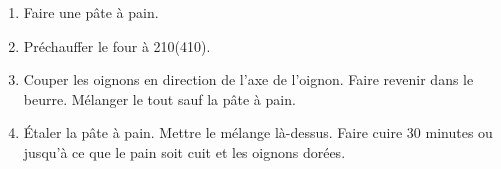 
\begin{ingredients}
\end{ingredients}


\begin{recipe}
  \begin{enumerate}

  \item Faire une p\^ate \`a pain.

  \item Pr\'echauffer le four \`a 210\degreeC (410\F).

  \item Couper les oignons en direction de l'axe de l'oignon.
    Faire revenir dans le beurre.
    M\'elanger le tout sauf la p\^ate \`a pain.

  \item \'Etaler la p\^ate \`a pain.  Mettre le m\'elange
    l\`a-dessus.  Faire cuire 30 minutes ou jusqu'\`a ce que le pain
    soit cuit et les oignons dor\'ees.

  \end{enumerate}
\end{recipe}
